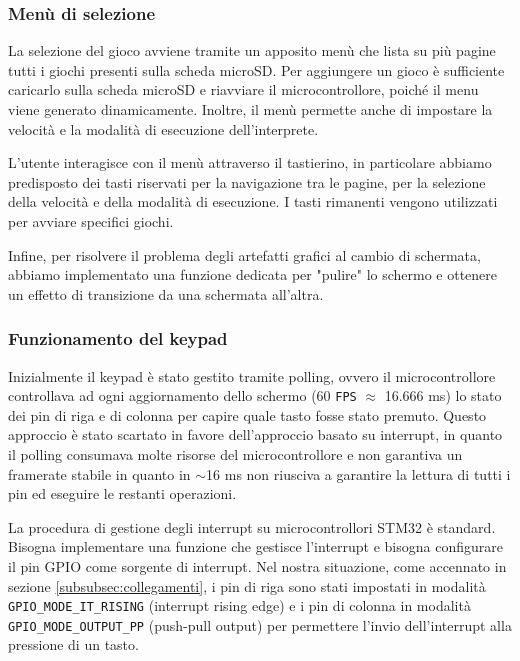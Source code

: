 \documentclass[a4paper]{article}
\begin{document}
\subsubsection{Menù di selezione}

La selezione del gioco avviene tramite un apposito menù che lista su più pagine tutti i giochi
presenti sulla scheda microSD. Per aggiungere un gioco è sufficiente caricarlo sulla scheda
microSD e riavviare il microcontrollore, poiché il menu viene generato dinamicamente.
Inoltre, il menù permette anche di impostare la velocità e la modalità di esecuzione
dell'interprete.

L'utente interagisce con il menù attraverso il tastierino, in particolare abbiamo predisposto
dei tasti riservati per la navigazione tra le pagine, per la selezione della velocità e
della modalità di esecuzione. I tasti rimanenti vengono utilizzati per avviare specifici giochi.

Infine, per risolvere il problema degli artefatti grafici al cambio di schermata,
abbiamo implementato una funzione dedicata per "pulire" lo schermo e ottenere un effetto
di transizione da una schermata all'altra.

\subsubsection{Funzionamento del keypad}\label{subsubsec:keypad}

Inizialmente il keypad è stato gestito tramite polling, ovvero il microcontrollore controllava
ad ogni aggiornamento dello schermo (60 \texttt{FPS} $\approx$ 16.666 ms) lo stato dei pin di riga
e di colonna per capire quale tasto fosse stato premuto. Questo approccio è stato scartato in
favore dell'approccio basato su interrupt, in quanto il polling consumava molte risorse del
microcontrollore e non garantiva un framerate stabile in quanto in $\sim$16 ms non riusciva a
garantire la lettura di tutti i pin ed eseguire le restanti operazioni.

La procedura di gestione degli interrupt su microcontrollori STM32 è standard. Bisogna implementare
una funzione che gestisce l'interrupt e bisogna configurare il pin GPIO come sorgente di interrupt.
Nel nostra situazione, come accennato in sezione \ref{subsubsec:collegamenti}, i pin di riga sono
stati impostati in modalità \texttt{GPIO\_MODE\_IT\_RISING} (interrupt rising edge) e i pin di
colonna in modalità \texttt{GPIO\_MODE\_OUTPUT\_PP} (push-pull output) per permettere l'invio
dell'interrupt alla pressione di un tasto.
\end{document}
